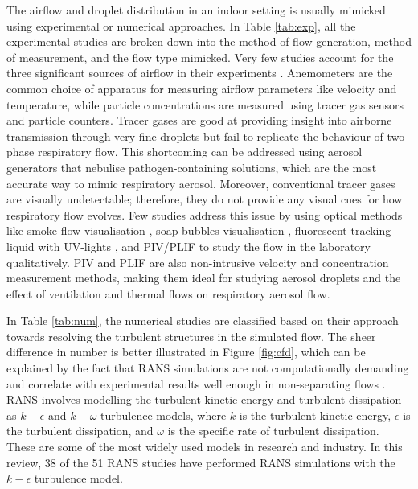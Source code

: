 \documentclass[a4paper,12pt]{elsarticle}
\begin{document}
The airflow and droplet distribution in an indoor setting is usually mimicked using experimental or numerical approaches. In Table \ref{tab:exp}, all the experimental studies are broken down into the method of flow generation, method of measurement, and the flow type mimicked. Very few studies account for the three significant sources of airflow in their experiments \cite{zhou2021experimental,zhang2019distribution}. Anemometers are the common choice of apparatus for measuring airflow parameters like velocity and temperature, while particle concentrations are measured using tracer gas sensors and particle counters. Tracer gases are good at providing insight into airborne transmission through very fine droplets but fail to replicate the behaviour of two-phase respiratory flow. This shortcoming can be addressed using aerosol generators that nebulise pathogen-containing solutions, which are the most accurate way to mimic respiratory aerosol. Moreover, conventional tracer gases are visually undetectable; therefore, they do not provide any visual cues for how respiratory flow evolves. Few studies address this issue by using optical methods like smoke flow visualisation \cite{saarinen2015large,giri2022colliding}, soap bubbles visualisation \cite{bluyssen2021effect}, fluorescent tracking liquid with UV-lights \cite{ortiz2022testing}, and PIV/PLIF \cite{faleiros2022tu,poussou2010flow} to study the flow in the laboratory qualitatively. PIV and PLIF are also non-intrusive velocity and concentration measurement methods, making them ideal for studying aerosol droplets and the effect of ventilation and thermal flows on respiratory aerosol flow.

In Table \ref{tab:num}, the numerical studies are classified based on their approach towards resolving the turbulent structures in the simulated flow. The sheer difference in number is better illustrated in Figure \ref{fig:cfd}, which can be explained by the fact that RANS simulations are not computationally demanding and correlate with experimental results well enough in non-separating flows \cite{wu2023numerical}. RANS involves modelling the turbulent kinetic energy and turbulent dissipation as $k-\epsilon$ and $k-\omega$ turbulence models, where $k$ is the turbulent kinetic energy, $\epsilon$ is the turbulent dissipation, and $\omega$ is the specific rate of turbulent dissipation. These are some of the most widely used models in research and industry. In this review, 38 of the 51 RANS studies have performed RANS simulations with the $k-\epsilon$ turbulence model.
\end{document}
